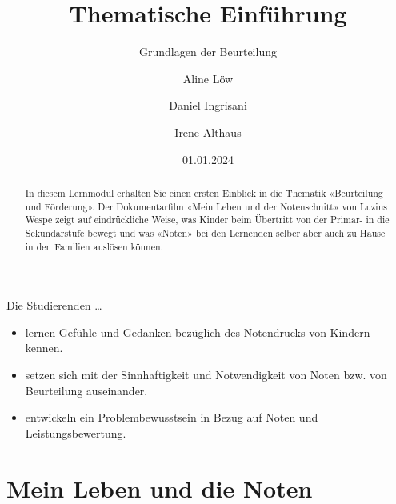 \documentclass[
  10pt,
  a4paper,
  DIV=11]{scrartcl}
\title{Thematische Einführung}
\subtitle{Grundlagen der Beurteilung}
\author{Aline Löw \and Daniel Ingrisani \and Irene Althaus}
\date{01.01.2024}
\providecommand{\tightlist}{%
  \setlength{\itemsep}{0pt}\setlength{\parskip}{0pt}}\usepackage{longtable,booktabs,array}
\begin{document}
\maketitle
\begin{abstract}
In diesem Lernmodul erhalten Sie einen ersten Einblick in die Thematik
«Beurteilung und Förderung». Der Dokumentarfilm «Mein Leben und der
Notenschnitt» von Luzius Wespe zeigt auf eindrückliche Weise, was Kinder
beim Übertritt von der Primar- in die Sekundarstufe bewegt und was
«Noten» bei den Lernenden selber aber auch zu Hause in den Familien
auslösen können.
\end{abstract}

\begin{tcolorbox}[enhanced jigsaw, opacitybacktitle=0.6, toprule=.15mm, title=\textcolor{quarto-callout-note-color}{\faInfo}\hspace{0.5em}{Ziele des Lernmoduls}, bottomrule=.15mm, toptitle=1mm, colframe=quarto-callout-note-color-frame, opacityback=0, coltitle=black, colback=white, colbacktitle=quarto-callout-note-color!10!white, left=2mm, leftrule=.75mm, bottomtitle=1mm, rightrule=.15mm, breakable, titlerule=0mm, arc=.35mm]

Die Studierenden \ldots{}

\begin{itemize}
\tightlist
\item
  lernen Gefühle und Gedanken bezüglich des Notendrucks von Kindern
  kennen.
\item
  setzen sich mit der Sinnhaftigkeit und Notwendigkeit von Noten bzw.
  von Beurteilung auseinander.
\item
  entwickeln ein Problembewusstsein in Bezug auf Noten und
  Leistungsbewertung.
\end{itemize}

\end{tcolorbox}

\section{Mein Leben und die Noten}\label{mein-leben-und-die-noten}
\end{document}
